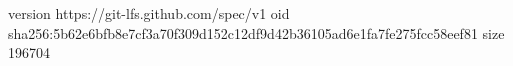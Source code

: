 version https://git-lfs.github.com/spec/v1
oid sha256:5b62e6bfb8e7cf3a70f309d152c12df9d42b36105ad6e1fa7fe275fcc58eef81
size 196704
